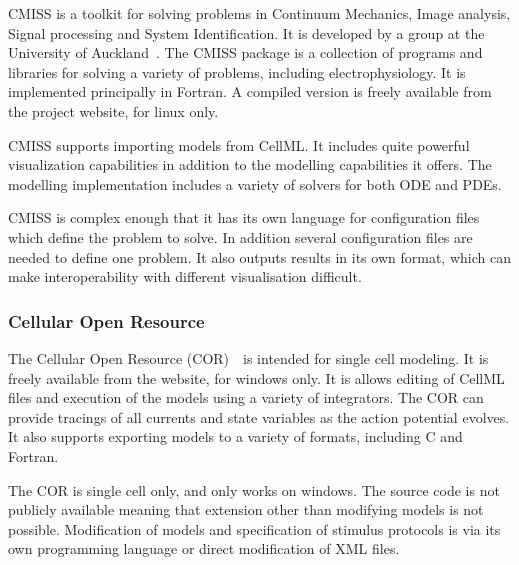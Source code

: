 CMISS is a toolkit for solving problems in Continuum Mechanics, Image analysis,
Signal processing and System Identification.
It is developed by a group at the University of Auckland~\cite{CMISS}.
The CMISS package is a collection of programs and libraries for solving a
variety of problems, including electrophysiology.
It is implemented principally in Fortran.
A compiled version is freely available from the project website, for linux only.

CMISS supports importing models from CellML.
It includes quite powerful visualization capabilities in addition to the
modelling capabilities it offers.
The modelling implementation includes a variety of solvers for both ODE and
PDEs.

CMISS is complex enough that it has its own language for configuration files
which define the problem to solve.
In addition several configuration files are needed to define one problem.
It also outputs results in its own format, which can make interoperability
with different visualisation difficult.

\subsubsection{Cellular Open Resource}

The Cellular Open Resource (COR)~\cite{Garney2003}\ is intended for single cell
modeling.
It is freely available from the website, for windows only.
It is allows editing of CellML files and execution of the models using a variety
of integrators.
The COR can provide tracings of all currents and state variables as the action
potential evolves.
It also supports exporting models to a variety of formats, including C and
Fortran.

The COR is single cell only, and only works on windows.
The source code is not publicly available meaning that extension other than
modifying models is not possible.
Modification of models and specification of stimulus protocols is via its own
programming language or direct modification of XML files.
